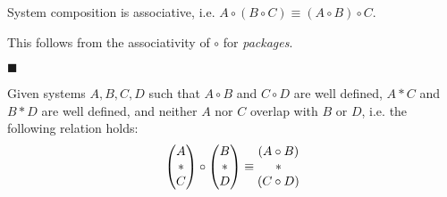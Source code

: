 \begin{lemma}
System composition is associative, i.e. $A \circ (B \circ C) \equiv (A \circ B) \circ C$.

 This follows from the associativity of $\circ$ for \emph{packages}.

$\blacksquare$
\end{lemma}

\begin{lemma}
\label{thm:interchange_system}
Given systems $A, B, C, D$ such that $A \circ B$ and $C \circ D$ are well defined,
$A * C$ and $B * D$ are well defined,
and neither $A$ nor $C$ overlap with $B$ or $D$, i.e.
the following relation holds:
$$
\begin{pmatrix} 
A\cr
*\cr
C\cr
\end{pmatrix} 
\circ
\begin{pmatrix} 
B\cr
*\cr
D\cr
\end{pmatrix} 
\equiv
\begin{matrix} 
  (A \circ B)\cr
*\cr
  (C \circ D)\cr
\end{matrix} 
$$


\end{lemma}
